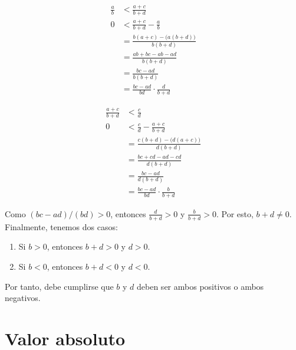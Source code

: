 \documentclass[11pt]{article}
\newcommand{\R}{\mathbb{R}}
\let\set\Set
\begin{document}
\begin{enumerate}[label=\alph*)]
    \begin{center}
    \begin{minipage}[l]{.5\linewidth}
    \begin{align*}
        \frac{a}{b} &< \frac{a+c}{b+d}\\
        0 &< \frac{a+c}{b+d} - \frac{a}{b}\\
        &= \frac{b(a+c)-\bigl(a(b+d)\bigr)}{b(b+d)}\\
        &= \frac{ab+bc-ab-ad}{b(b+d)}\\
        &= \frac{bc-ad}{b(b+d)}\\
        &= \frac{bc-ad}{bd} \cdot \frac{d}{b+d}
    \end{align*}
    \end{minipage}%
    \begin{minipage}[r]{.5\linewidth}
    \begin{align*}
        \frac{a+c}{b+d} &< \frac{c}{d}\\
        0 &< \frac{c}{d} -\frac{a+c}{b+d}\\
        &= \frac{c(b+d)-\bigl(d(a+c)\bigr)}{d(b+d)}\\
        &= \frac{bc+cd-ad-cd}{d(b+d)}\\
        &= \frac{bc-ad}{d(b+d)}\\
        &= \frac{bc-ad}{bd} \cdot \frac{b}{b+d}
    \end{align*}
    \end{minipage}
    \end{center}
    Como $(bc-ad)/(bd)>0$, entonces $\frac{d}{b+d}>0$ y $\frac{b}{b+d}>0$. Por esto, $b+d\neq 0$. Finalmente, tenemos dos casos: \begin{enumerate}[label=\roman*)]
        \item Si $b>0$, entonces $b+d>0$ y $d>0$.
        \item Si $b<0$, entonces $b+d<0$ y $d<0$.
    \end{enumerate}

    Por tanto, debe cumplirse que $b$ y $d$ deben ser ambos positivos o ambos negativos.

\end{enumerate}

\section*{Valor absoluto}
\end{document}
